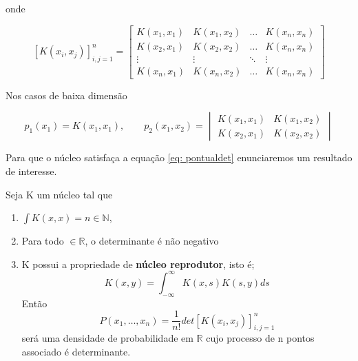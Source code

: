 onde

\[
[K(x_i,x_j)]_{i,j=1}^{n} = 
\begin{bmatrix}
	K(x_1, x_1) & K(x_1, x_2) & \dots & K(x_n, x_n) \\
	K(x_2, x_1) & K(x_2, x_2) & \dots & K(x_n, x_n) \\
	\vdots & \vdots & \ddots & \vdots \\
	K(x_n, x_1) & K(x_n, x_2) & \dots & K(x_n, x_n)
\end{bmatrix}
\]

Nos casos de baixa dimensão

\[
p_1(x_1) = K(x_1,x_1), \quad \quad p_2(x_1,x_2) =
\begin{vmatrix}
	K(x_1, x_1) & K(x_1, x_2) \\
	K(x_2, x_1) & K(x_2, x_2)
\end{vmatrix}
\]

Para que o núcleo satisfaça a equação \ref{eq: pontualdet} enunciaremos um resultado de interesse.

\begin{theorem}
	Seja K um núcleo tal que
	\begin{enumerate}[label=(\alph*)]
		\item $\int K(x,x) = n \in \mathbb{N}$,
		\item Para todo  $\in \mathbb{R}$, o determinante é não negativo
		\item K possui a propriedade de \textbf{núcleo reprodutor}, isto é;
		\[
		K(x,y) = \int_{-\infty}^{\infty} K(x,s) K(s,y) ds
		\]
		Então
		\[
		P(x_1,\dots, x_n) = \frac{1}{n!} det[K(x_i, x_j)]_{i,j=1}^{n}
		\]
		será uma densidade de probabilidade em $\mathbb{R}$ cujo processo de n pontos associado é determinante.
	\end{enumerate}
\end{theorem}

